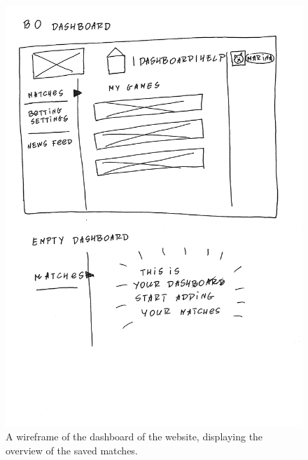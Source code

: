 \begin{figure}[H]
	\begin{center}
		\includegraphics[width=.90\textwidth]{design/images/B0.jpg}
		\caption{A wireframe of the dashboard of the website, displaying the overview of the saved matches.} \label{fig:using:wireframe_b0}
	\end{center}
\end{figure}


